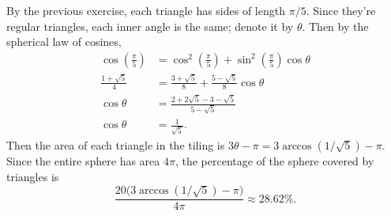 \documentclass[twoside,10pt]{article}
\begin{document}
By the previous exercise, each triangle has sides of length $\pi/5$. Since they're regular triangles, each inner angle is the same; denote it by $\theta$. Then by the spherical law of cosines,
\begin{align*}
	\cos\left( \frac{\pi}{5}  \right) &= \cos^2\left( \frac{\pi}{5}  \right) + \sin^2\left( \frac{\pi}{5}  \right) \cos \theta \\
	\frac{1+\sqrt{5} }{4} &= \frac{3+\sqrt{5} }{8} + \frac{5-\sqrt{5} }{8} \cos \theta \\
	\cos \theta &= \frac{2+2\sqrt{5} -3-\sqrt{5} }{5-\sqrt{5} } \\
	\cos \theta &= \frac{1}{\sqrt{5} } .
\end{align*}
Then the area of each triangle in the tiling is $3 \theta - \pi = 3\arccos(1/\sqrt{5} )-\pi$. Since the entire sphere has area $4\pi$, the percentage of the sphere covered by triangles is
\[
	\frac{20 \big( 3\arccos(1/\sqrt{5} )-\pi \big)}{4\pi} \approx 28.62\%.
\] 

\newpage
\end{document}
